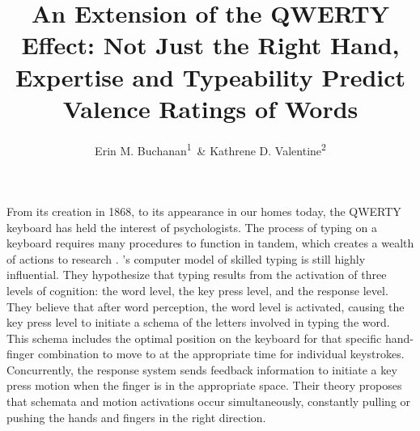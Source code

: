 \documentclass[english,man,man,mask]{apa6}
\title{An Extension of the QWERTY Effect: Not Just the Right Hand, Expertise
and Typeability Predict Valence Ratings of Words}
\author{Erin M. Buchanan\textsuperscript{1}~\& Kathrene D.
Valentine\textsuperscript{2}}
\date{}
\affiliation{
\vspace{0.5cm}
\textsuperscript{1} Missouri State University\\\textsuperscript{2} University of Missouri}
\theoremstyle{definition}
\theoremstyle{definition}
\theoremstyle{definition}
\theoremstyle{remark}
\begin{document}
\maketitle


















From its creation in 1868, to its appearance in our homes today, the
QWERTY keyboard has held the interest of psychologists. The process of
typing on a keyboard requires many procedures to function in tandem,
which creates a wealth of actions to research \autocite{Inhoff1997}.
\textcite{Rumelhart1982}'s computer model of skilled typing is still
highly influential. They hypothesize that typing results from the
activation of three levels of cognition: the word level, the key press
level, and the response level. They believe that after word perception,
the word level is activated, causing the key press level to initiate a
schema of the letters involved in typing the word. This schema includes
the optimal position on the keyboard for that specific hand-finger
combination to move to at the appropriate time for individual
keystrokes. Concurrently, the response system sends feedback information
to initiate a key press motion when the finger is in the appropriate
space. Their theory proposes that schemata and motion activations occur
simultaneously, constantly pulling or pushing the hands and fingers in
the right direction.
\end{document}
